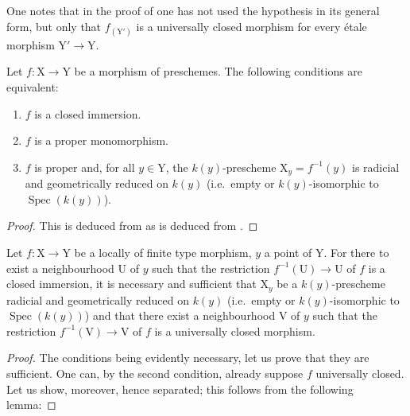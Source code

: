 \begin{remark}[18.12.5]
\label{IV.18.12.5}
One notes that in the proof of  one has not used the hypothesis  in its general form, but only that $f_{(\mathrm{Y}')}$ is a universally closed morphism for every \'etale morphism $\mathrm{Y}'\to\mathrm{Y}$.
\end{remark}

\begin{corollary}[18.12.6]
\label{IV.18.12.6}
Let $f:\mathrm{X}\to\mathrm{Y}$ be a morphism of preschemes.
The following conditions are equivalent:
\begin{enumerate}[label=\alph*)]
  \item $f$ is a closed immersion.
  \item $f$ is a proper monomorphism.
  \item $f$ is proper and, for all $y\in\mathrm{Y}$, the $k(y)$-prescheme $\mathrm{X}_y=f^{-1}(y)$ is radicial and geometrically reduced on $k(y)$ (i.e.\ empty or $k(y)$-isomorphic to $\operatorname{Spec}(k(y))$).
\end{enumerate}
\end{corollary}

\begin{proof}
This is deduced from  as  is deduced from .
\end{proof}

\begin{proposition}[18.12.7]
\label{IV.18.12.7}
Let $f:\mathrm{X}\to\mathrm{Y}$ be a locally of finite type morphism, $y$ a point of $\mathrm{Y}$.
For there to exist a neighbourhood $\mathrm{U}$ of $y$ such that the restriction $f^{-1}(\mathrm{U})\to\mathrm{U}$ of $f$ is a closed immersion, it is necessary and sufficient that $\mathrm{X}_y$ be a $k(y)$-prescheme radicial and geometrically reduced on $k(y)$ (i.e.\ empty or $k(y)$-isomorphic to $\operatorname{Spec}(k(y))$) and that there exist a neighbourhood $\mathrm{V}$ of $y$ such that the restriction $f^{-1}(\mathrm{V})\to\mathrm{V}$ of $f$ is a universally closed morphism.
\end{proposition}

\begin{proof}
The conditions being evidently necessary, let us prove that they are sufficient.
One can, by the second condition, already suppose $f$ universally closed.
Let us show, moreover, hence separated; this follows from the following lemma:
\end{proof}

